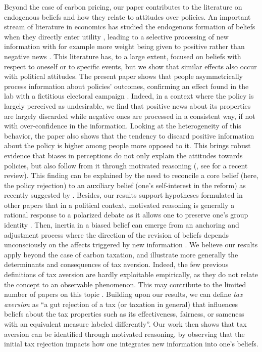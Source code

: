 \documentclass[11pt]{article}
\begin{document}
Beyond the case of carbon pricing, our paper contributes to the literature on endogenous beliefs and how they relate to attitudes over policies. An important stream of literature in economics has studied the endogenous formation of beliefs when they directly enter utility \citep[e.g.][]{benabou_self-confidence_2002}, leading to a selective processing of new information with for example more weight being given to positive rather than negative news \citep[][]{eil_good_2011,mobius_et_al_2011,sharot_et_al_2011}. This literature has, to a large extent, focused on beliefs with respect to oneself or to specific events, but we show that similar effects also occur with political attitudes. The present paper shows that people asymmetrically process information about policies' outcomes, confirming an effect found in the lab with a fictitious electoral campaign \citep{redlawsk_hot_2002}. Indeed, in a context where the policy is largely perceived as undesirable, we find that positive news about its properties are largely discarded while negative ones are processed in a consistent way, if not with over-confidence in the information. Looking at the heterogeneity of this behavior, the paper also shows that the tendency to discard positive information about the policy is higher among people more opposed to it. This brings robust evidence that biases in perceptions do not only explain the attitudes towards policies, but also follow from it through motivated reasoning (\citet{ziva_kunda_case_1990}, see \citet{benabou_mindful_2016} for a recent review). This finding can be explained by the need to reconcile a core belief (here, the policy rejection) to an auxiliary belief (one's self-interest in the reform) as recently suggested by \citet{little_distortion_2019}. Besides, our results support hypotheses formulated in other papers that in a political context, motivated reasoning is generally a rational response to a polarized debate \citep{kahan_ideology_2013} as it allows one to preserve one's group identity \citep{druckman_evidence_2019}. Then, inertia in a biased belief can emerge from an anchoring and adjustment process where the direction of the revision of beliefs depends unconsciously on the affects triggered by new information \citep{taber_motivated_2001}. We believe our results apply beyond the case of carbon taxation, and illustrate more generally the determinants and consequences of tax aversion. Indeed, the few previous definitions of tax aversion \citep{sussman_axe_2011} are hardly exploitable empirically, as they do not relate the concept to an observable phenomenon. This may contribute to the limited number of papers on this topic \citep{kallbekken_et_al_2011,kessler_tax_2016}. Building upon our results, we can define \textit{tax aversion} as ``a gut rejection of a tax (or taxation in general) that influences beliefs about the tax properties such as its effectiveness, fairness, or sameness with an equivalent measure labeled differently''. Our work then shows that tax aversion can be identified through motivated reasoning, by observing that the initial tax rejection impacts how one integrates new information into one's beliefs. %
\end{document}
